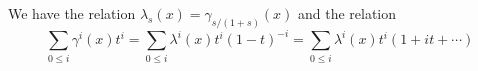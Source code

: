 We have the relation $\lambda_s(x) = \gamma_{s/(1+s)}(x)$ and the relation
$$\sum_{0 \leq i} \gamma^i(x)t^i = \sum_{0 \leq i} \lambda^i(x)t^i(1-t)^{-i} = \sum_{0 \leq i} \lambda^i(x)t^i(1+it + \cdots)$$
